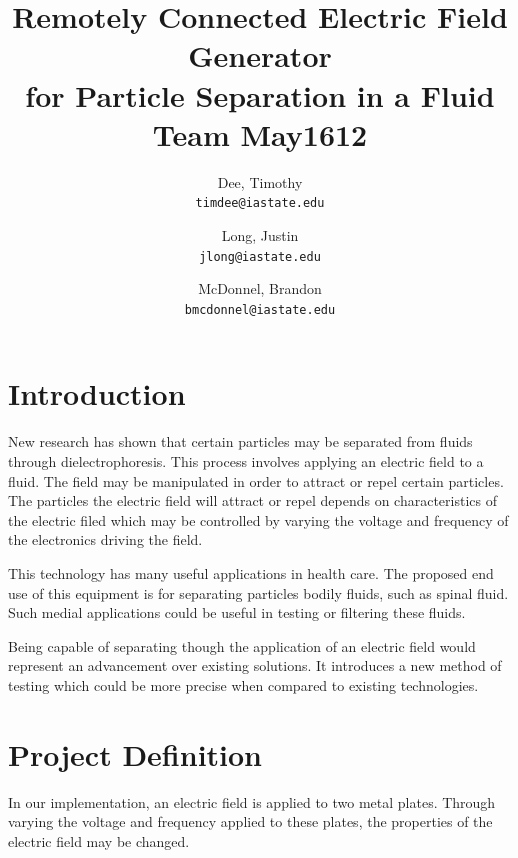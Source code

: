 \documentclass{article}	%
\author{Dee, Timothy\\
    \texttt{timdee@iastate.edu}
    \and
    Long, Justin\\
    \texttt{jlong@iastate.edu}
    \and
    McDonnel, Brandon\\
    \texttt{bmcdonnel@iastate.edu}
}
\title{Remotely Connected Electric Field Generator\\
for Particle Separation in a Fluid \\
\large{Team May1612}}
\newenvironment{vplace}[1][1]
  {\par\vspace*{\stretch{#1}}}
  {\vspace*{\stretch{1}}\par}
\begin{document}
\thispagestyle{empty}
\maketitle

\newpage
\tableofcontents
\newpage

\begin{multicols}{2}


\section{Introduction}
New research has shown that certain particles may be separated from fluids through dielectrophoresis.
This process involves applying an electric field to a fluid.
The field may be manipulated in order to attract or repel certain particles.
The particles the electric field will attract or repel depends on
characteristics of the electric filed which may be controlled
by varying the voltage and frequency of the electronics driving the field.

This technology has many useful applications in health care.
The proposed end use of this equipment is
for separating particles bodily fluids,
such as spinal fluid.
Such medial applications could be useful
in testing or filtering these fluids.

Being capable of separating though the
application of an electric field would represent
an advancement over existing solutions.
It introduces a new method of testing which
could be more precise when compared
to existing technologies.

\section{Project Definition}
In our implementation, an electric field is applied 
to two metal plates.
Through varying the voltage and frequency
applied to these plates, 
the properties of the electric field may be changed.


\end{multicols}
\end{document}
